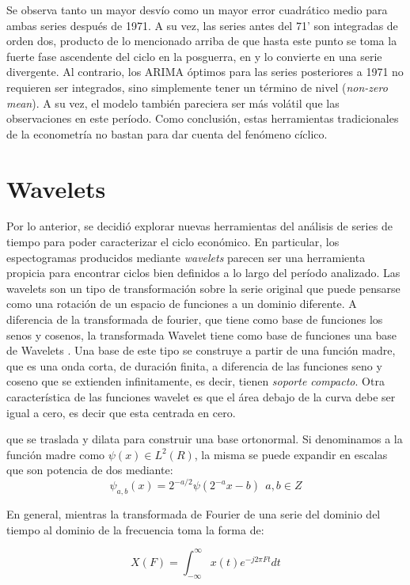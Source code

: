 \documentclass[a4paper]{article}
\begin{document}
Se observa tanto un mayor desvío como un mayor error cuadrático medio para ambas series después de 1971. A su vez, las series antes del 71' son integradas de orden dos, producto de lo mencionado arriba de que hasta este punto se toma la fuerte fase ascendente del ciclo en la posguerra, en y lo convierte en una serie divergente. Al contrario, los ARIMA óptimos para las series posteriores a 1971 no requieren ser integrados, sino simplemente tener un término de nivel (\textit{non-zero mean}). A su vez, el modelo también pareciera ser más volátil que las observaciones en este período. Como conclusión, estas herramientas tradicionales de la econometría no bastan para dar cuenta del fenómeno cíclico. 

\section{Wavelets}

Por lo anterior, se decidió explorar nuevas herramientas del análisis de series de tiempo para poder caracterizar el ciclo económico. En particular, los espectogramas producidos mediante \textit{wavelets} parecen ser una herramienta propicia para encontrar ciclos bien definidos a lo largo del período analizado. Las wavelets son un tipo de transformación sobre la serie original que puede pensarse como una rotación de un espacio de funciones a un dominio diferente. A diferencia de la transformada de fourier, que tiene como base de funciones los senos y cosenos, la transformada Wavelet tiene como base de funciones una base de Wavelets \cite{castro1995wavelets}. Una base de este tipo se construye a partir de una función madre, que es una onda corta, de duración finita, a diferencia de las funciones seno y coseno que se extienden infinitamente, es decir, tienen \textit{soporte compacto}. Otra característica de las funciones wavelet es que el área debajo de la curva debe ser igual a cero, es decir que esta centrada en cero.  


que se traslada y dilata para construir una base ortonormal.  Si denominamos a la función madre como $\psi(x)\in L^2(R)$, la misma se puede expandir en escalas que son potencia de dos mediante:
$$
\psi_{a,b}(x)=2^{-a/2}\psi(2^{-a} x-b) \ \ a,b \in Z
$$

En general, mientras la transformada de Fourier de una serie del dominio del tiempo al dominio de la frecuencia toma la forma de:

$$
X(F)=\int_{-\infty}^{\infty} x(t) e^{-j2\pi Ft}dt
$$
\end{document}

